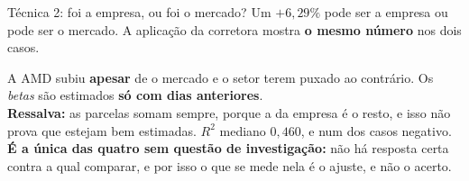 \documentclass[aspectratio=169]{beamer}
\begin{document}
\begin{frame}{Técnica 2: foi a empresa, ou foi o mercado?}
Um $+6{,}29\%$ pode ser a empresa ou pode ser o mercado. A aplicação da corretora
mostra \textbf{o mesmo número} nos dois casos.
\vspace{2mm}
\begin{center}
\end{center}
\vspace{1mm}
\footnotesize
A AMD subiu \textbf{apesar} de o mercado e o setor terem puxado ao contrário.
Os \emph{betas} são estimados \textbf{só com dias anteriores}.\\
\textbf{Ressalva:} as parcelas somam sempre, porque a da empresa é o resto, e isso não prova que
estejam bem estimadas. $R^2$ mediano $0{,}460$, e num dos casos negativo.\\
\textbf{É a única das quatro sem questão de investigação:} não há resposta certa contra a qual
comparar, e por isso o que se mede nela é o ajuste, e não o acerto.
\end{frame}
\end{document}
